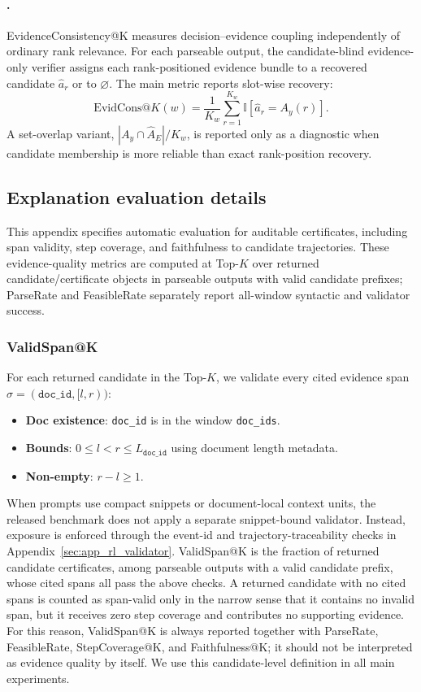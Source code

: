 \documentclass{article}
\begin{document}
\paragraph{\EvidCons@K.}
EvidenceConsistency@K measures decision--evidence coupling independently of ordinary rank relevance. For each parseable output, the candidate-blind evidence-only verifier assigns each rank-positioned evidence bundle to a recovered candidate $\hat a_r$ or to $\varnothing$. The main metric reports slot-wise recovery:
\begin{equation}
\mathrm{EvidCons}@K(w)=
\frac{1}{K_w}
\sum_{r=1}^{K_w}\mathbb{I}[\hat a_r=A_y(r)].
\end{equation}
A set-overlap variant, $|A_y\cap \widehat{A}_E|/K_w$, is reported only as a diagnostic when candidate membership is more reliable than exact rank-position recovery.

\subsection{Explanation evaluation details}
\label{sec:app_explain_eval}

This appendix specifies automatic evaluation for auditable certificates, including span validity, step coverage, and faithfulness to candidate trajectories.
These evidence-quality metrics are computed at Top-$K$ over returned candidate/certificate objects in parseable outputs with valid candidate prefixes; ParseRate and FeasibleRate separately report all-window syntactic and validator success.

\subsubsection{ValidSpan@K}
\label{sec:app_explain_validspan}

For each returned candidate in the Top-$K$, we validate every cited evidence span $\sigma=(\texttt{doc\_id},[l,r))$:
\begin{itemize}
    \item \textbf{Doc existence}: \texttt{doc\_id} is in the window \texttt{doc\_ids}.
    \item \textbf{Bounds}: $0\le l < r \le L_{\texttt{doc\_id}}$ using document length metadata.
    \item \textbf{Non-empty}: $r-l\ge 1$.
\end{itemize}
When prompts use compact snippets or document-local context units, the released benchmark does not apply a separate snippet-bound validator.
Instead, exposure is enforced through the event-id and trajectory-traceability checks in Appendix~\ref{sec:app_rl_validator}.
ValidSpan@K is the fraction of returned candidate certificates, among parseable outputs with a valid candidate prefix, whose cited spans all pass the above checks.
A returned candidate with no cited spans is counted as span-valid only in the narrow sense that it contains no invalid span, but it receives zero step coverage and contributes no supporting evidence.
For this reason, ValidSpan@K is always reported together with ParseRate, FeasibleRate, StepCoverage@K, and Faithfulness@K; it should not be interpreted as evidence quality by itself.
We use this candidate-level definition in all main experiments.
\end{document}
